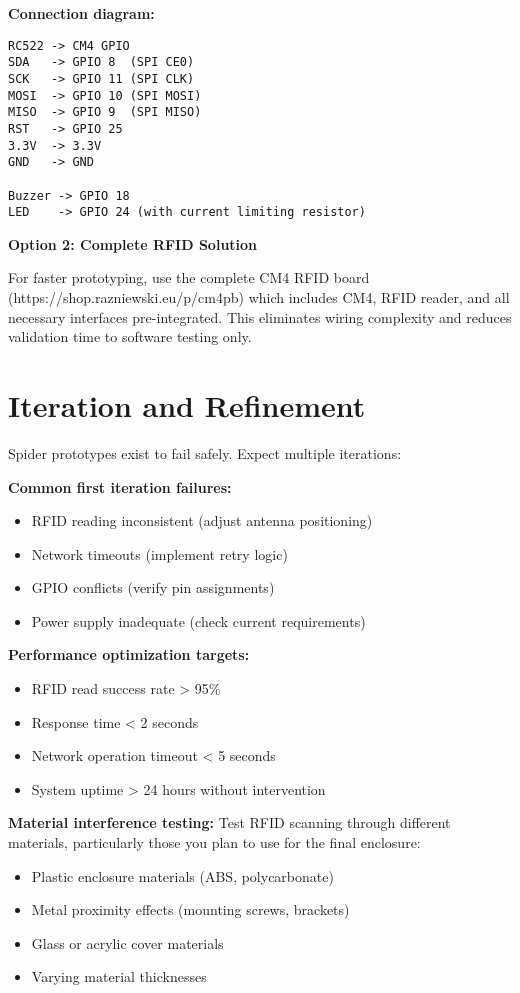 \textbf{Connection diagram:}
\begin{verbatim}
RC522 -> CM4 GPIO
SDA   -> GPIO 8  (SPI CE0)
SCK   -> GPIO 11 (SPI CLK)
MOSI  -> GPIO 10 (SPI MOSI)
MISO  -> GPIO 9  (SPI MISO)
RST   -> GPIO 25
3.3V  -> 3.3V
GND   -> GND

Buzzer -> GPIO 18
LED    -> GPIO 24 (with current limiting resistor)
\end{verbatim}

\textbf{Option 2: Complete RFID Solution}

For faster prototyping, use the complete CM4 RFID board (https://shop.razniewski.eu/p/cm4pb) which includes CM4, RFID reader, and all necessary interfaces pre-integrated. This eliminates wiring complexity and reduces validation time to software testing only.

\section{Iteration and Refinement}

Spider prototypes exist to fail safely. Expect multiple iterations:

\textbf{Common first iteration failures:}
\begin{itemize}
\item RFID reading inconsistent (adjust antenna positioning)
\item Network timeouts (implement retry logic)
\item GPIO conflicts (verify pin assignments)
\item Power supply inadequate (check current requirements)
\end{itemize}

\textbf{Performance optimization targets:}
\begin{itemize}
\item RFID read success rate > 95\%
\item Response time < 2 seconds
\item Network operation timeout < 5 seconds
\item System uptime > 24 hours without intervention
\end{itemize}

\textbf{Material interference testing:}
Test RFID scanning through different materials, particularly those you plan to use for the final enclosure:
\begin{itemize}
\item Plastic enclosure materials (ABS, polycarbonate)
\item Metal proximity effects (mounting screws, brackets)
\item Glass or acrylic cover materials
\item Varying material thicknesses
\end{itemize}

